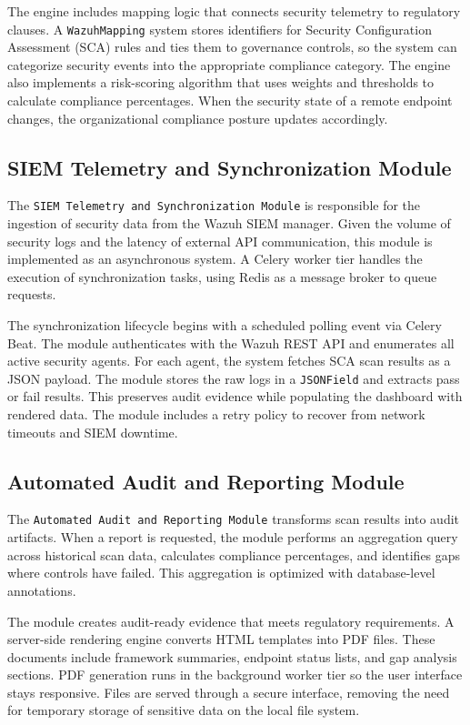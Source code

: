 The engine includes mapping logic that connects security telemetry to regulatory clauses. A \texttt{WazuhMapping} system stores identifiers for Security Configuration Assessment (SCA) rules and ties them to governance controls, so the system can categorize security events into the appropriate compliance category. The engine also implements a risk-scoring algorithm that uses weights and thresholds to calculate compliance percentages. When the security state of a remote endpoint changes, the organizational compliance posture updates accordingly.

\subsection{SIEM Telemetry and Synchronization Module}
The \texttt{SIEM Telemetry and Synchronization Module} is responsible for the ingestion of security data from the Wazuh SIEM manager. Given the volume of security logs and the latency of external API communication, this module is implemented as an asynchronous system. A Celery worker tier handles the execution of synchronization tasks, using Redis as a message broker to queue requests.

The synchronization lifecycle begins with a scheduled polling event via Celery Beat. The module authenticates with the Wazuh REST API and enumerates all active security agents. For each agent, the system fetches SCA scan results as a JSON payload. The module stores the raw logs in a \texttt{JSONField} and extracts pass or fail results. This preserves audit evidence while populating the dashboard with rendered data. The module includes a retry policy to recover from network timeouts and SIEM downtime.

\subsection{Automated Audit and Reporting Module}
The \texttt{Automated Audit and Reporting Module} transforms scan results into audit artifacts. When a report is requested, the module performs an aggregation query across historical scan data, calculates compliance percentages, and identifies gaps where controls have failed. This aggregation is optimized with database-level annotations.

The module creates audit-ready evidence that meets regulatory requirements. A server-side rendering engine converts HTML templates into PDF files. These documents include framework summaries, endpoint status lists, and gap analysis sections. PDF generation runs in the background worker tier so the user interface stays responsive. Files are served through a secure interface, removing the need for temporary storage of sensitive data on the local file system.

